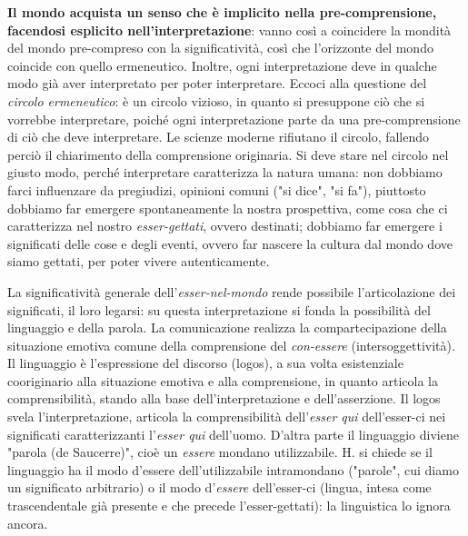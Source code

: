\documentclass[a4paper,12pt,oneside]{article}%
\begin{document}
\textbf{Il mondo acquista un senso che è implicito nella pre-comprensione, facendosi esplicito nell'interpretazione}: vanno così a coincidere la mondità del mondo pre-compreso con la significatività, così che l'orizzonte del mondo coincide con quello ermeneutico. Inoltre, ogni interpretazione deve in qualche modo già aver interpretato per poter interpretare. Eccoci alla questione del \textit{circolo ermeneutico}: è un circolo vizioso, in quanto si presuppone ciò che si vorrebbe interpretare, poiché ogni interpretazione parte da una pre-comprensione di ciò che deve interpretare. Le scienze moderne rifiutano il circolo, fallendo perciò il chiarimento della comprensione originaria. Si deve stare nel circolo nel giusto modo, perché interpretare caratterizza la natura umana: non dobbiamo farci influenzare da pregiudizi, opinioni comuni ("si dice", "si fa"), piuttosto dobbiamo far emergere spontaneamente la nostra prospettiva, come cosa che ci caratterizza nel nostro \textit{esser-gettati}, ovvero destinati; dobbiamo far emergere i significati delle cose e degli eventi, ovvero far nascere la cultura dal mondo dove siamo gettati, per poter vivere autenticamente.

La significatività generale dell'\textit{esser-nel-mondo} rende possibile l'articolazione dei significati, il loro legarsi: su questa interpretazione si fonda la possibilità del linguaggio e della parola. La comunicazione realizza la compartecipazione della situazione emotiva comune della comprensione del \textit{con-essere} (intersoggettività). Il linguaggio  è l'espressione del discorso (logos), a sua volta esistenziale cooriginario alla situazione emotiva e alla comprensione, in quanto articola la comprensibilità, stando alla base dell'interpretazione e dell'asserzione. Il logos svela l'interpretazione, articola la comprensibilità dell'\textit{esser qui} dell'esser-ci nei significati caratterizzanti l'\textit{esser qui} dell'uomo. D'altra parte il linguaggio diviene "parola (de Saucerre)", cioè un \textit{essere} mondano utilizzabile. H. si chiede se il linguaggio ha il modo d'essere dell'utilizzabile intramondano ("parole", cui diamo un significato arbitrario) o il modo d'\textit{essere} dell'esser-ci (lingua, intesa come trascendentale già presente e che precede l'esser-gettati): la linguistica lo ignora ancora.
\end{document}
